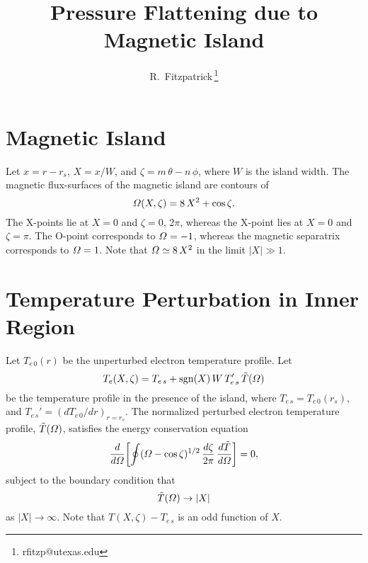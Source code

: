 \documentclass[12pt,prb,aps,notitlepage]{revtex4-1}
\begin{document}
\title{Pressure Flattening due to Magnetic Island}
\author{R.~Fitzpatrick\,\footnote{rfitzp@utexas.edu}}
\begin{abstract}
\end{abstract}
\maketitle

\section{Magnetic Island}
Let $x=r-r_s$, $X=x/W$, and $\zeta= m\,\theta-n\,\phi$, where $W$ is the island width. The magnetic flux-surfaces of the magnetic island are contours of
\begin{equation}
{\mit\Omega}(X,\zeta) = 8\,X^2 + \cos\zeta.
\end{equation}
The X-points lie at $X=0$ and $\zeta = 0$, $2\pi$, whereas the X-point lies at
$X=0$ and $\zeta=\pi$. The O-point corresponds to ${\mit\Omega}=-1$, whereas the magnetic separatrix corresponds to ${\mit\Omega}=1$.  Note that ${\mit\Omega}\simeq
8\,X^2$ in the limit $|X|\gg 1$. 

\section{Temperature Perturbation in Inner Region}
Let $T_{e\,0}(r)$ be the unperturbed electron temperature profile. Let 
\begin{equation}\label{e2}
T_e(X,\zeta) = T_{e\,s} + {\rm sgn}(X)\,W\,T_{e\,s}'\,\tilde{T}({\mit\Omega})
\end{equation}
 be the temperature profile in the presence of the island,
where $T_{e\,s}=T_{e\,0}(r_s)$, and  $T_{e\,s}'=(dT_{e\,0}/dr)_{r=r_s}$. 
The normalized perturbed electron temperature profile, $\tilde{T}({\mit\Omega})$,  satisfies the energy conservation equation
\begin{equation}\label{e3}
\frac{d}{d{\mit\Omega}}\!\left[\oint({\mit\Omega}-\cos\zeta)^{1/2}\,\frac{d\zeta}{2\pi}\,\frac{d\tilde{T}}{d
{\mit\Omega}} \right]= 0,
\end{equation}
subject to the boundary condition that
\begin{equation}\label{e4}
\tilde{T}({\mit\Omega}) \rightarrow |X|
\end{equation}
as $|X|\rightarrow\infty$. Note that $T(X,\zeta)-T_{e\,s}$ is an odd function of $X$. 
\end{document}
